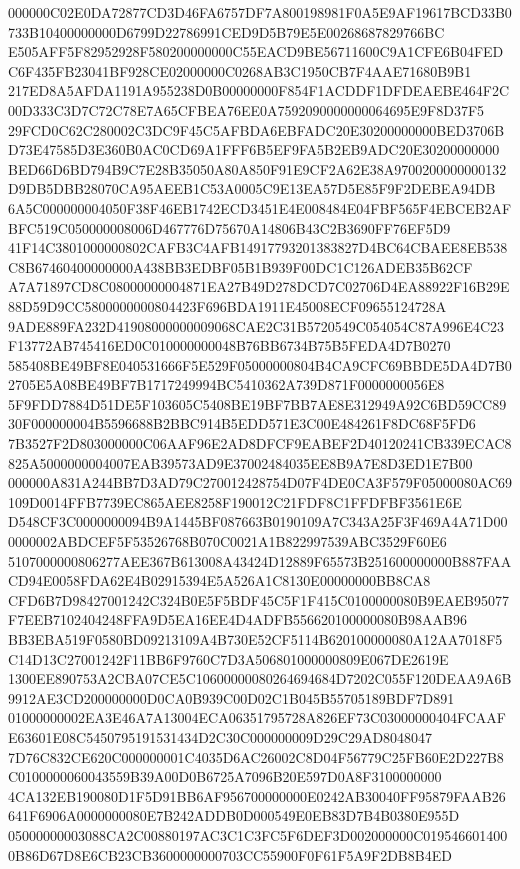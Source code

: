 \documentclass[UTF8,fontset=fandol,zihao=-4,a4paper]{ctexart}
\begin{document}
{{000000C02E0DA72877CD3D46FA6757DF7A800198981F0A5E9AF19617BCD33B0733B10400000000D6799D22786991CED9D5B79E5E00268687829766BC
E505AFF5F82952928F580200000000C55EACD9BE56711600C9A1CFE6B04FEDC6F435FB23041BF928CE02000000C0268AB3C1950CB7F4AAE71680B9B1
217ED8A5AFDA1191A955238D0B00000000F854F1ACDDF1DFDEAEBE464F2C00D333C3D7C72C78E7A65CFBEA76EE0A7592090000000064695E9F8D37F5
29FCD0C62C280002C3DC9F45C5AFBDA6EBFADC20E30200000000BED3706BD73E47585D3E360B0AC0CD69A1FFF6B5EF9FA5B2EB9ADC20E30200000000
BED66D6BD794B9C7E28B35050A80A850F91E9CF2A62E38A9700200000000132D9DB5DBB28070CA95AEEB1C53A0005C9E13EA57D5E85F9F2DEBEA94DB
6A5C000000004050F38F46EB1742ECD3451E4E008484E04FBF565F4EBCEB2AFBFC519C050000008006D467776D75670A14806B43C2B3690FF76EF5D9
41F14C3801000000802CAFB3C4AFB14917793201383827D4BC64CBAEE8EB538C8B67460400000000A438BB3EDBF05B1B939F00DC1C126ADEB35B62CF
A7A71897CD8C08000000004871EA27B49D278DCD7C02706D4EA88922F16B29E88D59D9CC5800000000804423F696BDA1911E45008ECF09655124728A
9ADE889FA232D41908000000009068CAE2C31B5720549C054054C87A996E4C23F13772AB745416ED0C010000000048B76BB6734B75B5FEDA4D7B0270
585408BE49BF8E040531666F5E529F05000000804B4CA9CFC69BBDE5DA4D7B02705E5A08BE49BF7B1717249994BC5410362A739D871F0000000056E8
5F9FDD7884D51DE5F103605C5408BE19BF7BB7AE8E312949A92C6BD59CC8930F000000004B5596688B2BBC914B5EDD571E3C00E484261F8DC68F5FD6
7B3527F2D803000000C06AAF96E2AD8DFCF9EABEF2D40120241CB339ECAC8825A5000000004007EAB39573AD9E37002484035EE8B9A7E8D3ED1E7B00
000000A831A244BB7D3AD79C270012428754D07F4DE0CA3F579F05000080AC69109D0014FFB7739EC865AEE8258F190012C21FDF8C1FFDFBF3561E6E
D548CF3C0000000094B9A1445BF087663B0190109A7C343A25F3F469A4A71D000000002ABDCEF5F53526768B070C0021A1B822997539ABC3529F60E6
5107000000806277AEE367B613008A43424D12889F65573B251600000000B887FAACD94E0058FDA62E4B02915394E5A526A1C8130E00000000BB8CA8
CFD6B7D98427001242C324B0E5F5BDF45C5F1F415C0100000080B9EAEB95077F7EEB7102404248FFA9D5EA16EE4D4ADFB556620100000080B98AAB96
BB3EBA519F0580BD09213109A4B730E52CF5114B620100000080A12AA7018F5C14D13C27001242F11BB6F9760C7D3A506801000000809E067DE2619E
1300EE890753A2CBA07CE5C10600000080264694684D7202C055F120DEAA9A6B9912AE3CD200000000D0CA0B939C00D02C1B045B55705189BDF7D891
01000000002EA3E46A7A13004ECA06351795728A826EF73C03000000404FCAAFE63601E08C5450795191531434D2C30C000000009D29C29AD8048047
7D76C832CE620C000000001C4035D6AC26002C8D04F56779C25FB60E2D227B8C0100000060043559B39A00D0B6725A7096B20E597D0A8F3100000000
4CA132EB190080D1F5D91BB6AF956700000000E0242AB30040FF95879FAAB26641F6906A0000000080E7B242ADDB0D000549E0EB83D7B4B0380E955D
05000000003088CA2C00880197AC3C1C3FC5F6DEF3D002000000C0195466014000B86D67D8E6CB23CB3600000000703CC55900F0F61F5A9F2DB8B4ED
}}
\end{document}
